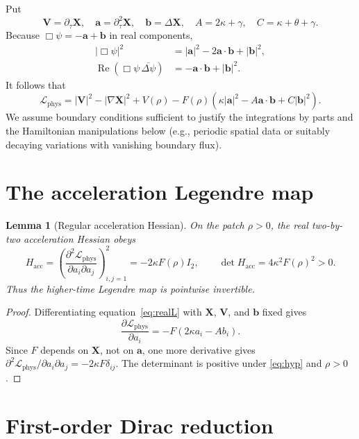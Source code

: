 \documentclass[11pt]{article}
\newtheorem{lemma}{Lemma}
\newcommand{\cL}{\mathcal{L}}
\newcommand{\bX}{\mathbf{X}}
\newcommand{\bV}{\mathbf{V}}
\newcommand{\ba}{\mathbf{a}}
\newcommand{\bb}{\mathbf{b}}
\begin{document}
Put
\begin{equation}
\bV=\partial_\tau\bX,\quad
\ba=\partial_\tau^2\bX,\quad
\bb=\Delta\bX,\quad
A=2\kappa+\gamma,\quad C=\kappa+\theta+\gamma.
\end{equation}
Because $\Box\psi=-\ba+\bb$ in real components,
\begin{align}
|\Box\psi|^2&=|\ba|^2-2\ba\cdot\bb+|\bb|^2,\\
\operatorname{Re}(\Box\psi\,\overline{\Delta\psi})
&=-\ba\cdot\bb+|\bb|^2.
\end{align}
It follows that
\begin{equation}\label{eq:realL}
\boxed{\cL_{\mathrm{phys}}=|\bV|^2-|\nabla\bX|^2+V(\rho)
-F(\rho)\left(\kappa|\ba|^2-A\ba\cdot\bb+C|\bb|^2\right).}
\end{equation}
We assume boundary conditions sufficient to justify the integrations by
parts and the Hamiltonian manipulations below (e.g., periodic spatial data
or suitably decaying variations with vanishing boundary flux).

\section{The acceleration Legendre map}

\begin{lemma}[Regular acceleration Hessian]\label{lem:hessian}
On the patch $\rho>0$, the real two-by-two acceleration Hessian obeys
\begin{equation}\label{eq:hessian}
H_{\mathrm{acc}}=
\left(\frac{\partial^2\cL_{\mathrm{phys}}}
{\partial a_i\partial a_j}\right)_{i,j=1}^{2}
=-2\kappa F(\rho)I_2,
\qquad \det H_{\mathrm{acc}}=4\kappa^2F(\rho)^2>0.
\end{equation}
Thus the higher-time Legendre map is pointwise invertible.
\end{lemma}
\begin{proof}
Differentiating equation~\eqref{eq:realL} with $\bX$, $\bV$,
and $\bb$ fixed gives
\begin{equation}
\frac{\partial\cL_{\mathrm{phys}}}{\partial a_i}
=-F(2\kappa a_i-Ab_i).
\end{equation}
Since $F$ depends on $\bX$, not on $\ba$, one more derivative gives
$\partial^2\cL_{\mathrm{phys}}/\partial a_i\partial a_j
=-2\kappa F\delta_{ij}$. The determinant is positive under
\eqref{eq:hyp} and $\rho>0$.
\end{proof}

\section{First-order Dirac reduction}
\end{document}

